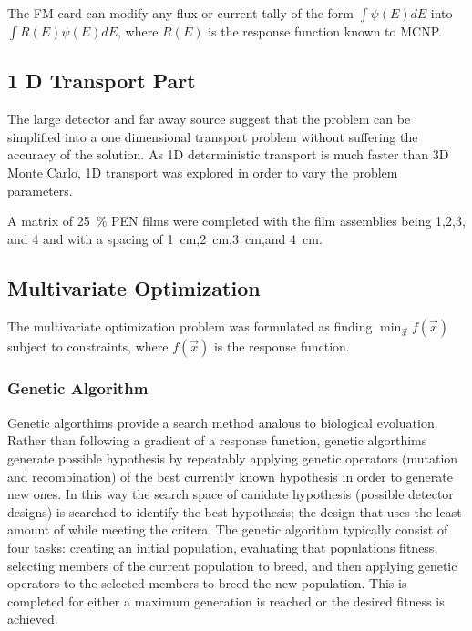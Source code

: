The FM card can modify any flux or current tally of the form $\int \psi (E) dE$ into $\int R(E)\psi(E) dE$, where $R(E)$ is the response function known to MCNP.
\subsection{1 D Transport Part}
The large detector and far away source suggest that the problem can be simplified into a one dimensional transport problem without suffering the accuracy of the solution.
As 1D deterministic transport is much faster than 3D Monte Carlo, 1D transport was explored in order to vary the problem parameters.

A matrix of \SI{25}{\percent}  PEN films were completed with the film assemblies being 1,2,3, and 4 and with a spacing of \SI{1}{\centi\meter},\SI{2}{\centi\meter},\SI{3}{\centi\meter},and \SI{4}{\centi\meter}. 


\subsection{Multivariate Optimization}
\label{sec:MVOptimization}

The multivariate optimization problem was formulated as finding $\min_{\vec{x}} f (\vec{x})$ subject to constraints, where $f(\vec{x})$ is the response function.

\subsubsection{Genetic Algorithm}
\label{sec:GeneticAlgoMethods}
Genetic algorthims provide a search method analous to biological evoluation.
Rather than following a gradient of a response function, genetic algorthims generate possible hypothesis by repeatably applying genetic operators (mutation and recombination) of the best currently known hypothesis in order to generate new ones.
In this way the search space of canidate hypothesis (possible detector designs) is searched to identify the best hypothesis; the design that uses the least amount of  while meeting the critera.
The genetic algorithm typically consist of four tasks: creating an initial population, evaluating that populations fitness, selecting members of the current population to breed, and then applying genetic operators to the selected members to breed the new population. 
This is completed for either a maximum generation is reached or the desired fitness is achieved. 

